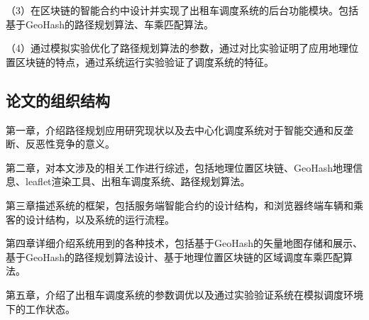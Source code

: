 （3）在区块链的智能合约中设计并实现了出租车调度系统的后台功能模块。包括基于GeoHash的路径规划算法、车乘匹配算法。

（4）通过模拟实验优化了路径规划算法的参数，通过对比实验证明了应用地理位置区块链的特点，通过系统运行实验验证了调度系统的特征。

\subsection{论文的组织结构}
第一章，介绍路径规划应用研究现状以及去中心化调度系统对于智能交通和反垄断、反恶性竞争的意义。

第二章，对本文涉及的相关工作进行综述，包括地理位置区块链、GeoHash地理信息、leaflet渲染工具、出租车调度系统、路径规划算法。

第三章描述系统的框架，包括服务端智能合约的设计结构，和浏览器终端车辆和乘客的设计结构，以及系统的运行流程。

第四章详细介绍系统用到的各种技术，包括基于GeoHash的矢量地图存储和展示、基于GeoHash的路径规划算法设计、基于地理位置区块链的区域调度车乘匹配算法。

第五章，介绍了出租车调度系统的参数调优以及通过实验验证系统在模拟调度环境下的工作状态。